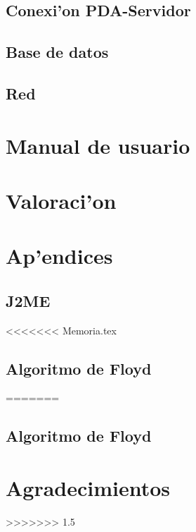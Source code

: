 \documentclass[a4paper,12pt]{article}
\begin{document}
	\subsection{Conexi'on PDA-Servidor}
		

	\subsection{Base de datos}
		

	\subsection{Red}


\pagebreak

\section{Manual de usuario}
		

\pagebreak

\section{Valoraci'on}

\pagebreak

\section{Ap'endices}

	\subsection{J2ME}
		

<<<<<<< Memoria.tex
	\subsection{Algoritmo de Floyd}
		
=======
	\index \subsection{Algoritmo de Floyd}
		

\pagebreak

\section{Agradecimientos}
	
>>>>>>> 1.5
\end{document}
